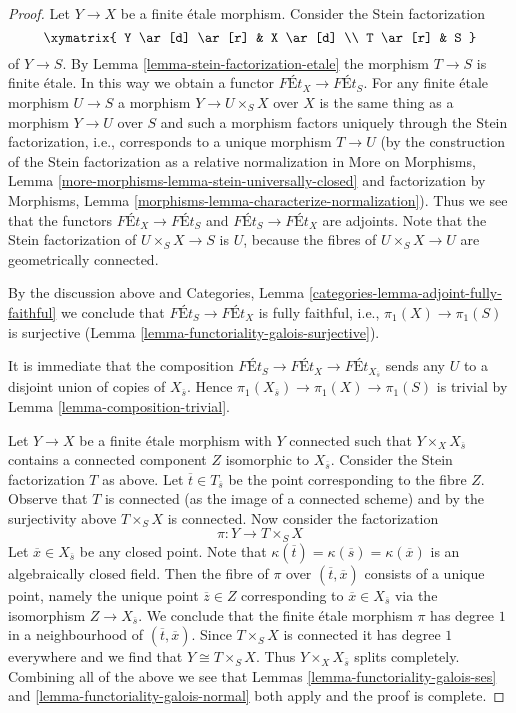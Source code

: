 \begin{proof}
Let $Y \to X$ be a finite \'etale morphism. Consider the Stein factorization
$$
\xymatrix{
Y \ar[d] \ar[r] & X \ar[d] \\
T \ar[r] & S
}
$$
of $Y \to S$. By Lemma \ref{lemma-stein-factorization-etale}
the morphism $T \to S$ is finite \'etale. In this way we obtain
a functor $\textit{F\'Et}_X \to \textit{F\'Et}_S$.
For any finite \'etale morphism $U \to S$ a morphism
$Y \to U \times_S X$ over $X$ is the same thing as a morphism
$Y \to U$ over $S$ and such a morphism factors uniquely through
the Stein factorization, i.e., corresponds to a unique
morphism $T \to U$
(by the construction of the Stein factorization as a relative
normalization in More on Morphisms, Lemma
\ref{more-morphisms-lemma-stein-universally-closed}
and factorization by
Morphisms, Lemma \ref{morphisms-lemma-characterize-normalization}).
Thus we see that the functors
$\textit{F\'Et}_X \to \textit{F\'Et}_S$ and
$\textit{F\'Et}_S \to \textit{F\'Et}_X$ are adjoints.
Note that the Stein factorization of $U \times_S X \to S$ is
$U$, because the fibres of $U \times_S X \to U$ are geometrically connected.

\medskip\noindent
By the discussion above and
Categories, Lemma \ref{categories-lemma-adjoint-fully-faithful}
we conclude that
$\textit{F\'Et}_S \to \textit{F\'Et}_X$
is fully faithful, i.e., $\pi_1(X) \to \pi_1(S)$ is surjective
(Lemma \ref{lemma-functoriality-galois-surjective}).

\medskip\noindent
It is immediate that the composition
$\textit{F\'Et}_S \to \textit{F\'Et}_X \to \textit{F\'Et}_{X_{\overline{s}}}$
sends any $U$ to a disjoint union of copies of $X_{\overline{s}}$.
Hence $\pi_1(X_{\overline{s}}) \to \pi_1(X) \to \pi_1(S)$ is trivial
by Lemma \ref{lemma-composition-trivial}.

\medskip\noindent
Let $Y \to X$ be a finite \'etale morphism with $Y$ connected such that
$Y \times_X X_{\overline{s}}$ contains a connected component $Z$
isomorphic to $X_{\overline{s}}$. Consider the Stein factorization $T$
as above. Let $\overline{t} \in T_{\overline{s}}$ be the point corresponding
to the fibre $Z$. Observe that $T$ is connected (as the image of a connected
scheme) and by the surjectivity above $T \times_S X$ is connected.
Now consider the factorization
$$
\pi : Y \longrightarrow T \times_S X
$$
Let $\overline{x} \in X_{\overline{s}}$ be any closed point. Note that
$\kappa(\overline{t}) = \kappa(\overline{s}) = \kappa(\overline{x})$
is an algebraically closed field.
Then the fibre of $\pi$ over $(\overline{t}, \overline{x})$ consists
of a unique point, namely the unique point $\overline{z} \in Z$
corresponding to $\overline{x} \in X_{\overline{s}}$ via the
isomorphism $Z \to X_{\overline{s}}$. We conclude that the finite
\'etale morphism $\pi$ has degree $1$ in a neighbourhood of
$(\overline{t}, \overline{x})$. Since $T \times_S X$ is connected
it has degree $1$ everywhere and we find that $Y \cong T \times_S X$.
Thus $Y \times_X X_{\overline{s}}$ splits completely.
Combining all of the above we see that
Lemmas \ref{lemma-functoriality-galois-ses} and
\ref{lemma-functoriality-galois-normal}
both apply and the proof is complete.
\end{proof}




